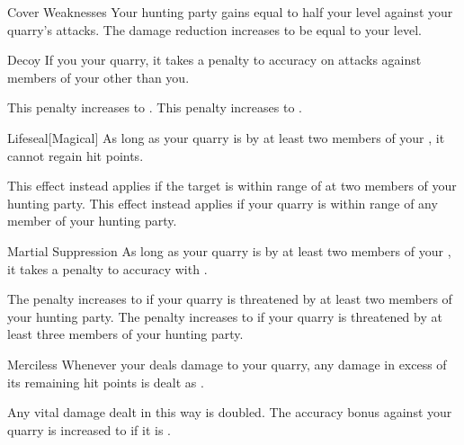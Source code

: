 {\begin{ability}{Cover Weaknesses}
                \rankline
                 Your hunting party gains  equal to half your level against your quarry's attacks.
                 The damage reduction increases to be equal to your level.
            \end{ability}

            \begin{ability}{Decoy}
                If you  your quarry, it takes a  penalty to accuracy on attacks against members of your  other than you.

                \rankline
                 This penalty increases to .
                 This penalty increases to .
            \end{ability}

            \begin{ability}{Lifeseal}[Magical]
                As long as your quarry is  by at least two members of your , it cannot regain hit points.

                \rankline
                 This effect instead applies if the target is within \rngmed range of at two members of your hunting party.
                 This effect instead applies if your quarry is within \rnglong range of any member of your hunting party.
            \end{ability}

            \begin{ability}{Martial Suppression}
                As long as your quarry is  by at least two members of your , it takes a  penalty to accuracy with .

                \rankline
                 The penalty increases to  if your quarry is threatened by at least two members of your hunting party.
                 The penalty increases to  if your quarry is threatened by at least three members of your hunting party.
            \end{ability}

            \begin{ability}{Merciless}
                Whenever your  deals damage to your quarry, any damage in excess of its remaining hit points is dealt as .

                \rankline
                 Any vital damage dealt in this way is doubled.
                 The accuracy bonus against your quarry is increased to  if it is .
            \end{ability}

}
